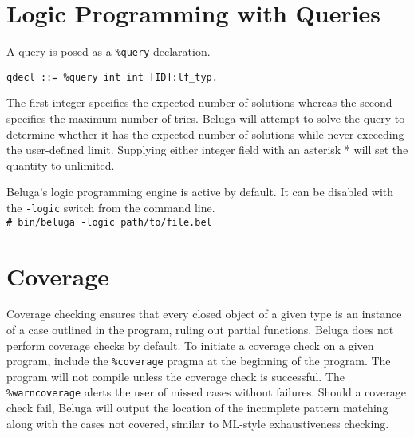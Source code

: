 \documentclass[11pt]{article}
\newcommand{\shellcmd}[1]{\\\indent\texttt{\# #1}\\}
\begin{document}


\section{Logic Programming with Queries}
A query is posed as a \texttt{\%query} declaration.
\begin{verbatim}
qdecl ::= %query int int [ID]:lf_typ.
\end{verbatim}
The first integer specifies the expected number of solutions whereas the second specifies the maximum number of tries. Beluga will attempt to solve the query to determine whether it has the expected number of solutions while never exceeding the user-defined limit. Supplying either integer field with an asterisk * will set the quantity to unlimited.

Beluga's logic programming engine is active by default. It can be disabled with the \texttt{-logic} switch from the command line.
\shellcmd{bin/beluga -logic path/to/file.bel}





\section{Coverage}
Coverage checking ensures that every closed object of a given type is an instance of a case outlined in the program, ruling out partial functions. Beluga does not perform coverage checks by default. To initiate a coverage check on a given program, include the \texttt{\%coverage} pragma at the beginning of the program. The program will not compile unless the coverage check is successful. The \texttt{\%warncoverage} alerts the user of missed cases without failures. Should a coverage check fail, Beluga will output the location of the incomplete pattern matching along with the cases not covered, similar to ML-style exhaustiveness checking.  
\end{document}
